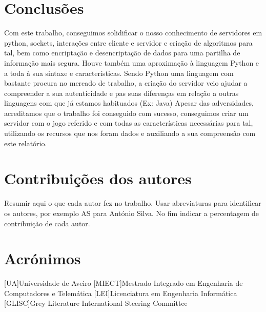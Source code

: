 \documentclass{report}
\begin{document}
\chapter{Conclusões}
\label{chap.conclusao}
Com este trabalho, conseguimos solidificar o nosso conhecimento de servidores em python, sockets, interações entre 
cliente e servidor e criação de algoritmos para tal, bem como encriptação e desencriptação de dados para uma partilha
de informação mais segura. Houve também uma aproximação à linguagem Python e a toda à sua sintaxe e características.
Sendo Python uma linguagem com bastante procura no mercado de trabalho, a criação do servidor veio ajudar a compreender
a sua autenticidade e pas suas diferenças em relação a outras linguagens com que já estamos habituados (Ex: Java)
Apesar das adversidades, acreditamos que o trabalho foi conseguido com sucesso, conseguimos criar um servidor 
com o jogo referido e com todas as características necessárias para tal, utilizando os recursos que nos foram dados
e auxiliando a sua compreensão com este relatório.

\chapter*{Contribuições dos autores}
Resumir aqui o que cada autor fez no trabalho.
Usar abreviaturas para identificar os autores,
por exemplo AS para António Silva.
No fim indicar a percentagem de contribuição de cada autor.

\chapter*{Acrónimos}
\begin{acronym}
[UA]{Universidade de Aveiro}
[MIECT]{Mestrado Integrado em Engenharia de Computadores e Telemática}
[LEI]{Licenciatura em Engenharia Informática}
[GLISC]{Grey Literature International Steering Committee}
\end{acronym}


\printbibliography
\end{document}
